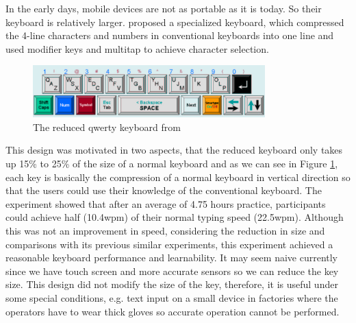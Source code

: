 \documentclass[11pt]{article}
\begin{document}
In the early days, mobile devices are not as portable as it is today. So their keyboard is relatively larger. \citet{10.1145/985921.986082} proposed a specialized keyboard, which compressed the 4-line characters and numbers in conventional keyboards into one line and used modifier keys and multitap to achieve character selection.
\begin{figure}[H]
  \centering
  \includegraphics[width=0.8\textwidth]{ReducedQWERTYKeyboard.png}
  \caption{The reduced qwerty keyboard from \citep{10.1145/985921.986082}}
  \label{fig:reducedKeyboard}
\end{figure}

This design was motivated in two aspects, that the reduced keyboard only takes up 15\% to 25\% of the size of a normal keyboard and as we can see in Figure \ref{fig:reducedKeyboard}, each key is basically the compression of a normal keyboard in vertical direction so that the users could use their knowledge of the conventional keyboard. The experiment showed that after an average of 4.75 hours practice, participants could achieve half (10.4wpm) of their normal typing speed (22.5wpm). Although this was not an improvement in speed, considering the reduction in size and comparisons with its previous similar experiments, this experiment achieved a reasonable keyboard performance and learnability. It may seem naive currently since we have touch screen and more accurate sensors so we can reduce the key size. This design did not modify the size of the key, therefore, it is useful under some special conditions, e.g. text input on a small device in factories where the operators have to wear thick gloves so accurate operation cannot be performed. 
\end{document}
